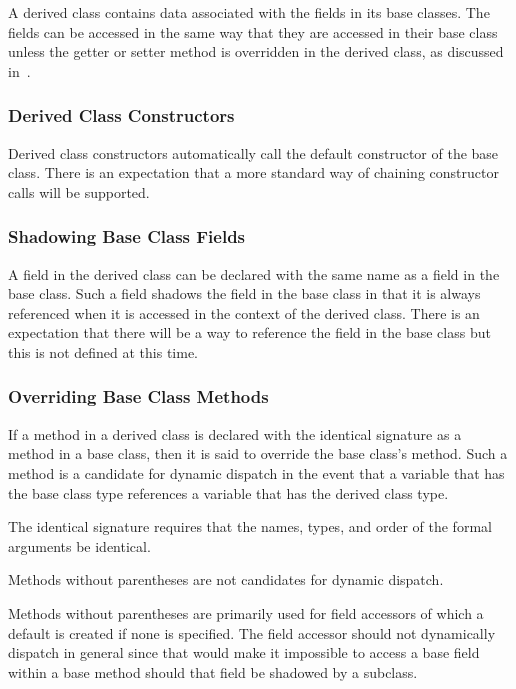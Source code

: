 A derived class contains data associated with the fields in its base
classes.  The fields can be accessed in the same way that they are
accessed in their base class unless the getter or setter method is
overridden in the derived class, as discussed
in~.

\subsubsection{Derived Class Constructors}
\label{Derived_Class_Constructors}

Derived class constructors automatically call the default constructor
of the base class.  There is an expectation that a more standard way
of chaining constructor calls will be supported.

\subsubsection{Shadowing Base Class Fields}
\label{Shadowing_Base_Class_Fields}

A field in the derived class can be declared with the same name as a
field in the base class.  Such a field shadows the field in the base
class in that it is always referenced when it is accessed in the
context of the derived class.  There is an expectation that there will
be a way to reference the field in the base class but this is not
defined at this time.

\subsubsection{Overriding Base Class Methods}
\label{Overriding_Base_Class_Methods}

If a method in a derived class is declared with the identical
signature as a method in a base class, then it is said to override the
base class's method.  Such a method is a candidate for dynamic
dispatch in the event that a variable that has the base class type
references a variable that has the derived class type.

The identical signature requires that the names, types, and order of
the formal arguments be identical.

Methods without parentheses are not candidates for dynamic dispatch.
\begin{rationale}
Methods without parentheses are primarily used for field accessors of
which a default is created if none is specified.  The field accessor
should not dynamically dispatch in general since that would make it
impossible to access a base field within a base method should that
field be shadowed by a subclass.
\end{rationale}

